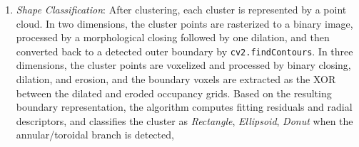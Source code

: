 \documentclass[11pt]{article}
\begin{document}
{\begin{enumerate}
\begin{table}[H]
    \centering
    \caption{Detailed clustering-parameter sensitivity results for Example 4.5 with noise level $\delta=5\%$.}
    \label{tab:cluster-parameter-sensitivity}
    \small
\end{table}
    \item \textit{Shape Classification}: After clustering, each cluster is represented by a point cloud. 
    In two dimensions, the cluster points are rasterized to a binary image, processed by a morphological closing followed by one dilation, and then converted back to a detected outer boundary by \texttt{cv2.findContours}. 
    In three dimensions, the cluster points are voxelized and processed by binary closing, dilation, and erosion, and the boundary voxels are extracted as the XOR between the dilated and eroded occupancy grids.
     Based on the resulting boundary representation, the algorithm computes fitting residuals and radial descriptors, and classifies the cluster as \emph{Rectangle}, \emph{Ellipsoid}, \emph{Donut} when the annular/toroidal branch is detected, 

\end{enumerate}}
\end{document}
